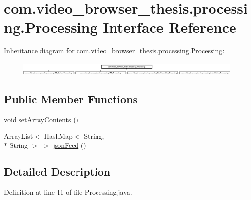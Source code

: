 \hypertarget{interfacecom_1_1video__browser__thesis_1_1processing_1_1_processing}{\section{com.\-video\-\_\-browser\-\_\-thesis.\-processing.\-Processing Interface Reference}
\label{interfacecom_1_1video__browser__thesis_1_1processing_1_1_processing}
}
Inheritance diagram for com.\-video\-\_\-browser\-\_\-thesis.\-processing.\-Processing\-:\begin{figure}[H]
\begin{center}
\leavevmode
\includegraphics[height=0.723514cm]{interfacecom_1_1video__browser__thesis_1_1processing_1_1_processing}
\end{center}
\end{figure}
\subsection*{Public Member Functions}
\begin{DoxyCompactItemize}
\item 
void \hyperlink{interfacecom_1_1video__browser__thesis_1_1processing_1_1_processing_ab3c4e926cce628403b82cd7a60f043b3}{set\-Array\-Contents} ()
\item 
Array\-List$<$ Hash\-Map$<$ String, \\*
String $>$ $>$ \hyperlink{interfacecom_1_1video__browser__thesis_1_1processing_1_1_processing_aced380bb6ea96302bbd0d1e00fb3679e}{json\-Feed} ()
\end{DoxyCompactItemize}


\subsection{Detailed Description}


Definition at line 11 of file Processing.\-java.




